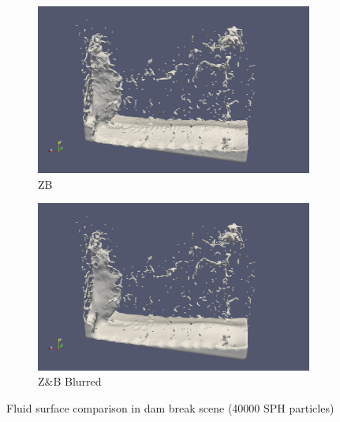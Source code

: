 \begin{figure}
	\begin{center}
        \begin{subfigure}[b]{\textwidth}
               \includegraphics[width=\textwidth]{figures/ReconstructionZhuBridson.png}
				\caption{ZB}
        \end{subfigure}
        \begin{subfigure}[b]{\textwidth}
               \includegraphics[width=\textwidth]{figures/ReconstructionZhuBridsonBlur.png}
				\caption{Z\&B Blurred}
        \end{subfigure}
	\end{center}
	\caption{Fluid surface comparison in dam break scene (40000 SPH particles)}
	\label{fig:DamBreak2}
\end{figure}

